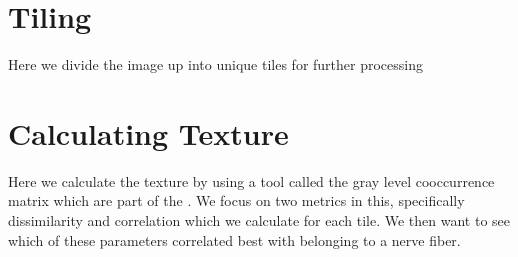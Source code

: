 \documentclass[letterpaper,10pt,english]{sphinxmanual}
\begin{document}
\noindent{}


\chapter{Tiling}
\label{\detokenize{06-AdvancedShapeAndTexture:tiling}}
\sphinxAtStartPar
Here we divide the image up into unique tiles for further processing

\begin{sphinxVerbatim}[commandchars=\\\{\}]
   
    \PYG{p}{[}\PYG{p}{]}
    \PYG{p}{[}\PYG{p}{]}
    
  
\PYG{p}{[} \PYG{p}{]}
\end{sphinxVerbatim}

\noindent{}


\chapter{Calculating Texture}
\label{\detokenize{06-AdvancedShapeAndTexture:calculating-texture}}
\sphinxAtStartPar
Here we calculate the texture by using a tool called the gray level co\sphinxhyphen{}occurrence matrix which are part of the . We focus on two metrics in this, specifically dissimilarity and correlation which we calculate for each tile. We then want to see which of these parameters correlated best with belonging to a nerve fiber.
\end{document}
